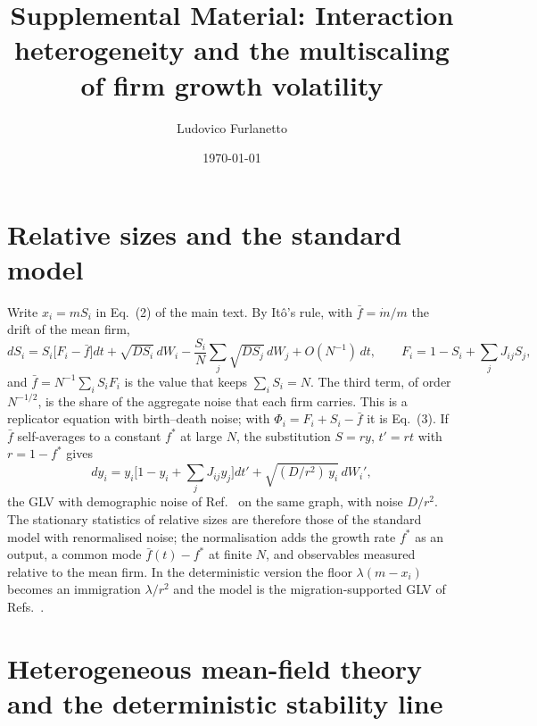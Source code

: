 \documentclass[pre,onecolumn,superscriptaddress,nofootinbib]{revtex4-2}
\begin{document}
\title{Supplemental Material: Interaction heterogeneity and the multiscaling of firm growth volatility}
\author{Ludovico Furlanetto}
\date{\today}
\maketitle

\section{Relative sizes and the standard model}
\label{sec:relative}

Write $x_i=mS_i$ in Eq.~(2) of the main text.  By It\^o's rule, with $\bar f=\dot m/m$ the drift of the
mean firm,
\begin{equation}
dS_i=S_i\big[F_i-\bar f\big]dt+\sqrt{DS_i}\,dW_i-\frac{S_i}{N}\sum_j\sqrt{DS_j}\,dW_j+O(N^{-1})\,dt,\qquad
F_i=1-S_i+\sum_jJ_{ij}S_j ,
\label{eq:rel}
\end{equation}
and $\bar f=N^{-1}\sum_iS_iF_i$ is the value that keeps $\sum_iS_i=N$.  The third term, of order
$N^{-1/2}$, is the share of the aggregate noise that each firm carries.  This is a replicator equation
with birth--death noise; with $\Phi_i=F_i+S_i-\bar f$ it is Eq.~(3).  If $\bar f$ self-averages to a constant
$f^*$ at large $N$, the substitution $S=ry$, $t'=rt$ with $r=1-f^*$ gives
\begin{equation}
dy_i=y_i\Big[1-y_i+\sum_jJ_{ij}y_j\Big]dt'+\sqrt{(D/r^2)\,y_i}\,dW_i' ,
\end{equation}
the GLV with demographic noise of Ref.~\cite{altieri2021} on the same graph, with noise $D/r^2$.  The
stationary statistics of relative sizes are therefore those of the standard model with renormalised
noise; the normalisation adds the growth rate $f^*$ as an output, a common mode $\bar f(t)-f^*$ at
finite $N$, and observables measured relative to the mean firm.  In the deterministic version the
floor $\lambda(m-x_i)$ becomes an immigration $\lambda/r^2$ and the model is the migration-supported GLV
of Refs.~\cite{bunin2017,mallmin2024}.

\section{Heterogeneous mean-field theory and the deterministic stability line}
\label{sec:hdmft}
\end{document}
